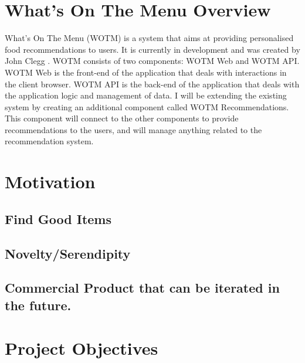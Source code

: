 \section{What's On The Menu Overview}

What's On The Menu (WOTM) is a system that aims at providing personalised food recommendations to users. It is currently in development and was created by John Clegg . WOTM consists of two components: WOTM Web and WOTM API. WOTM Web is the front-end of the application that deals with interactions in the client browser. WOTM API is the back-end of the application that deals with the application logic and management of data. I will be extending the existing system by creating an additional component called WOTM Recommendations. This component will connect to the other components to provide recommendations to the users, and will manage anything related to the recommendation system. 

\section{Motivation}
\subsection{Find Good Items}
\subsection{Novelty/Serendipity}
\subsection{Commercial Product that can be iterated in the future.}
\section{Project Objectives}
\subsection{}
\subsection{}
\subsection{}
\subsection{}


